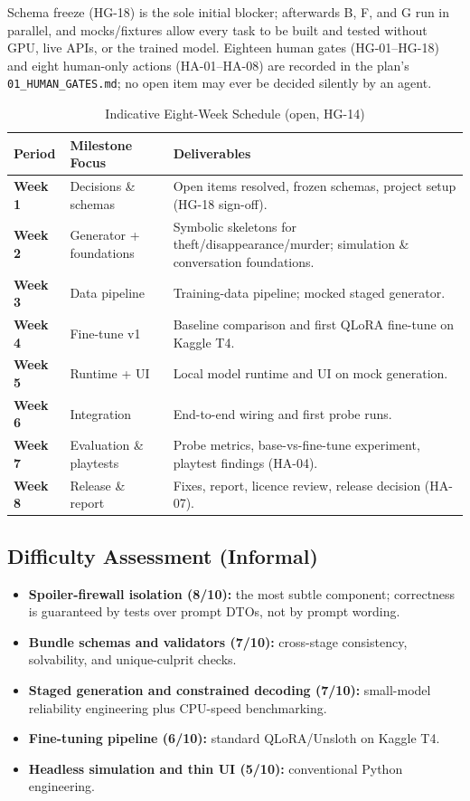\documentclass[11pt,a4paper]{article}
\providecommand{\toprule}{\hline\hline}
\providecommand{\midrule}{\hline}
\providecommand{\bottomrule}{\hline\hline}
\providecommand{\addlinespace}{\vspace{0.3em}}
\begin{document}
Schema freeze (HG-18) is the sole initial blocker; afterwards B, F, and G run in parallel, and mocks/fixtures allow every task to be built and tested without GPU, live APIs, or the trained model. Eighteen human gates (HG-01--HG-18) and eight human-only actions (HA-01--HA-08) are recorded in the plan's \texttt{01\_HUMAN\_GATES.md}; no open item may ever be decided silently by an agent.

\begin{table}[htbp]
\centering
\small
\caption{Indicative Eight-Week Schedule (open, HG-14)}
\label{tab:roadmap}
\begin{tabularx}{\textwidth}{llX}
\toprule
\textbf{Period} & \textbf{Milestone Focus} & \textbf{Deliverables} \\
\midrule
\textbf{Week 1} & Decisions \& schemas & Open items resolved, frozen schemas, project setup (HG-18 sign-off). \\
\addlinespace
\textbf{Week 2} & Generator + foundations & Symbolic skeletons for theft/disappearance/murder; simulation \& conversation foundations. \\
\addlinespace
\textbf{Week 3} & Data pipeline & Training-data pipeline; mocked staged generator. \\
\addlinespace
\textbf{Week 4} & Fine-tune v1 & Baseline comparison and first QLoRA fine-tune on Kaggle T4. \\
\addlinespace
\textbf{Week 5} & Runtime + UI & Local model runtime and UI on mock generation. \\
\addlinespace
\textbf{Week 6} & Integration & End-to-end wiring and first probe runs. \\
\addlinespace
\textbf{Week 7} & Evaluation \& playtests & Probe metrics, base-vs-fine-tune experiment, playtest findings (HA-04). \\
\addlinespace
\textbf{Week 8} & Release \& report & Fixes, report, licence review, release decision (HA-07). \\
\bottomrule
\end{tabularx}
\end{table}

\subsection{Difficulty Assessment (Informal)}
\begin{itemize}
    \item \textbf{Spoiler-firewall isolation (8/10):} the most subtle component; correctness is guaranteed by tests over prompt DTOs, not by prompt wording.
    \item \textbf{Bundle schemas and validators (7/10):} cross-stage consistency, solvability, and unique-culprit checks.
    \item \textbf{Staged generation and constrained decoding (7/10):} small-model reliability engineering plus CPU-speed benchmarking.
    \item \textbf{Fine-tuning pipeline (6/10):} standard QLoRA/Unsloth on Kaggle T4.
    \item \textbf{Headless simulation and thin UI (5/10):} conventional Python engineering.
\end{itemize}
\end{document}
